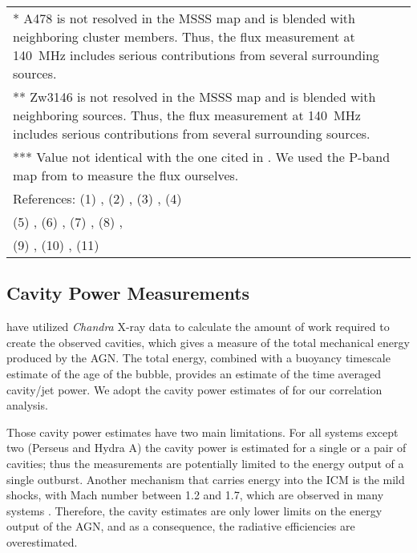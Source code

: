 \documentclass{aa}  %
\begin{document}
\begin{center}
\begin{table*}
{\begin{tabular}{l|l|l|ll|ll|ll|ll|ll}
\multicolumn{13}{l}{* A478 is not resolved in the MSSS map and is blended with neighboring cluster members. Thus, the flux measurement at 140~MHz includes serious contributions from several surrounding sources.} \\	
\multicolumn{13}{l}{** Zw3146 is not resolved in the MSSS map and is blended with neighboring sources. Thus, the flux measurement at 140~MHz includes serious contributions from several surrounding sources.} \\	
\multicolumn{13}{l}{*** Value not identical with the one cited in \cite{Birzan2008}. We used the P-band map from \cite{Birzan2008} to measure the flux ourselves.} \\
\multicolumn{13}{l}{References: (1) \cite{Pauliny1966}, (2) \cite{Condon1998}, (3) \cite{Andernacht1981}, (4) \cite{Burbidge1979} } \\
\multicolumn{13}{l}{ (5) \cite{Wall1985}, (6) \cite{Gregory1991}, (7) \cite{Haynes1975}, (8) \cite{Wright1990},  } \\	
\multicolumn{13}{l}{ (9) \cite{Sadler1984}, (10) \cite{Vollmer2005}, (11) \cite{Wright1994}  } \\
\end{tabular}
}
\label{tab:all_freq_flux}
\end{table*}
\end{center}





\subsection{Cavity Power Measurements}


\cite{Rafferty2006} have utilized \textit{Chandra} X-ray data to calculate the amount of work required to create the observed cavities, which gives a measure of the total mechanical energy produced by the AGN. 
The total energy, combined with a buoyancy timescale estimate of the age of the bubble, provides an estimate of the time averaged cavity/jet power.
We adopt the cavity power estimates of \cite{Rafferty2006} for our correlation analysis.

Those cavity power estimates have two main limitations.
For all systems except two (Perseus and Hydra A) the cavity power is estimated for a single or a pair of cavities; thus the measurements are potentially limited to the energy output of a single outburst.
Another mechanism that carries energy into the ICM is the mild shocks, with Mach number between 1.2 and 1.7, which are observed in many systems \citep{Fabian2006, McNamara2005, Nulsen2005, Nulsen2005b, Forman2005, Forman2007, SandersFabian2006, Wise2007, McNamaraNulsen2007}. Therefore, the cavity estimates are only lower limits on the energy output of the AGN, and as a consequence, the radiative efficiencies are overestimated. 
\end{document}
